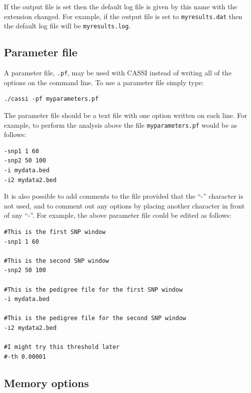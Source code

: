 \documentclass[a4paper,12pt]{article}
\newcommand{\code}[1]{{\footnotesize{{\tt #1}}}}
\begin{document}
If the output file is set then the default log file is given by this name with the extension changed. For example, if the output file is set to \code{myresults.dat} then the default log file will be \code{myresults.log}. 


\subsection{Parameter file}
\label{parameterfile}

A parameter file, \code{.pf}, may be used with CASSI instead of writing all of the options on the command line. To use a parameter file simply type: 
\vspace{0.35cm} \begin{lstlisting}
./cassi -pf myparameters.pf 
\end{lstlisting} \vspace{0.35cm}
The parameter file should be a text file with one option written on each line. For example, to perform the analysis above the file \code{myparameters.pf} would be as follows: 
\vspace{0.35cm} \begin{lstlisting}
-snp1 1 60
-snp2 50 100
-i mydata.bed
-i2 mydata2.bed

\end{lstlisting} \vspace{0.35cm}
It is also possible to add comments to the file provided that the ``-'' character is not used, and to comment out any options by placing another character in front of any ``-''. For example, the above parameter file could be edited as follows: 
\vspace{0.35cm} \begin{lstlisting}
#This is the first SNP window
-snp1 1 60

#This is the second SNP window
-snp2 50 100

#This is the pedigree file for the first SNP window
-i mydata.bed

#This is the pedigree file for the second SNP window
-i2 mydata2.bed

#I might try this threshold later
#-th 0.00001

\end{lstlisting} \vspace{0.35cm}

\subsection{Memory options}
\label{memory}
\end{document}
